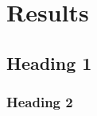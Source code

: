 \chapter[Results]{Results}
\label{Chap:Results}




\section{Heading 1}

\subsection{Heading 2}
\lipsum[4] %

